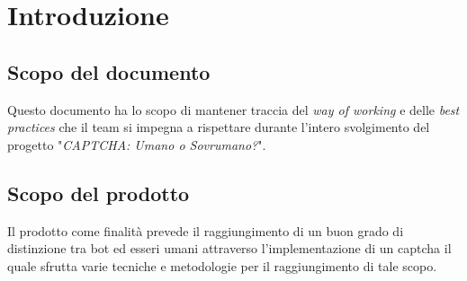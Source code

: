 \section{Introduzione}

\subsection{Scopo del documento}
Questo documento ha lo scopo di mantener traccia del \textit{way of working} 
e delle \textit{best practices} che il team si impegna a rispettare durante 
l'intero svolgimento del progetto "\textit{CAPTCHA: Umano o Sovrumano?}".

\subsection{Scopo del prodotto}
Il prodotto come finalità prevede il raggiungimento di un buon grado di distinzione tra bot ed esseri umani attraverso l'implementazione di un captcha il quale sfrutta varie tecniche e metodologie per il raggiungimento di tale scopo.
